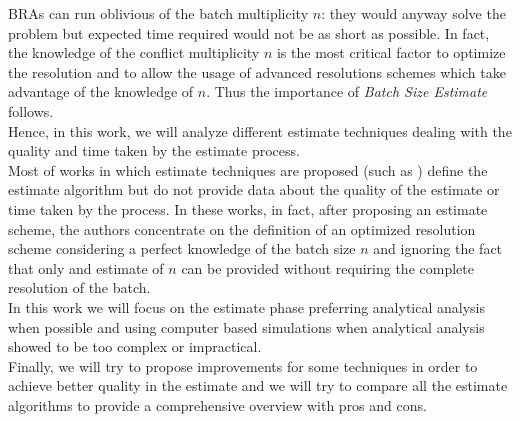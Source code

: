 \documentclass[12pt,a4paper]{report}
\begin{document}
BRAs can run oblivious of the batch multiplicity $n$: they would anyway solve the problem but expected time required would not be as short as possible. In fact, the knowledge of the conflict multiplicity $n$ is the most critical factor to optimize the resolution and to allow the usage of advanced resolutions schemes which take advantage of the knowledge of $n$. Thus the importance of \emph{Batch Size Estimate} follows.\\

Hence, in this work, we will analyze different estimate techniques dealing with the quality and time taken by the estimate process.\\
Most of works in which estimate techniques are proposed (such as \cite{cidon,greenberg87}) define the estimate  algorithm but do not provide data about the quality of the estimate or time taken by the process. In these works, in fact, after proposing an estimate scheme, the authors concentrate on the definition of an optimized resolution scheme considering a perfect knowledge of the batch size $n$ and ignoring the fact that only and estimate of $n$ can be provided without requiring the complete resolution of the batch.\\
In this work we will focus on the estimate phase preferring analytical analysis when possible and using computer based simulations when analytical analysis showed to be too complex or impractical.\\
Finally, we will try to propose improvements for some techniques in order to achieve better quality in the estimate and we will try to compare all the estimate algorithms to provide a comprehensive overview with pros and cons. 

\end{document}
